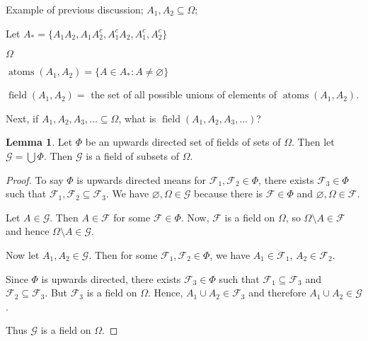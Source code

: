 \documentclass{article}
\DeclareMathOperator{\atoms}{atoms}
\DeclareMathOperator{\field}{field}
\theoremstyle{definition}
\newtheorem{lemma}[theorem]{Lemma}
\begin{document}
Example of previous discussion; $A_1, A_2 \subseteq \Omega$;

Let $A_* = \{A_1 A_2, A_1 A_2^c,A_1^c A_2,A_1^c,A_2^c\}$

\begin{center}
\Huge{${\Omega}$} \\ \vspace{0.5cm}
\end{center}

$\atoms(A_1, A_2) = \{A \in A_* : A \neq \varnothing\}$

$\field(A_1, A_2) = $ the set of all possible unions of elements of $\atoms (A_1, A_2)$.

Next, if $A_1,A_2,A_3,\dots \subseteq \Omega$, what is $\field (A_1,A_2,A_3,\dots)$?

\begin{lemma}
Let $\Phi$ be an upwards directed set of fields of sets of $\Omega$. Then let $\mathscr{G} = \bigcup \Phi$. Then $\mathscr{G}$ is a field of subsets of $\Omega$.
\end{lemma}
\begin{proof}
    To say $\Phi$ is upwards directed means for $\mathscr{F}_1, \mathscr{F}_2 \in \Phi$, there exists $\mathscr{F}_3 \in \Phi$ such that $\mathscr{F}_1, \mathscr{F}_2 \subseteq \mathscr{F}_3$.
    We have $\varnothing, \Omega \in \mathscr{G}$ because there is $\mathscr{F} 
    \in \Phi$ and $\varnothing, \Omega \in \mathscr{F}$.
    
    Let $A \in \mathscr{G}$. Then $A \in \mathscr{F}$ for some $\mathscr{F} \in \Phi$. Now, $\mathscr{F}$ is a field on $\Omega$, so $\Omega \setminus A \in \mathscr{F}$ and hence $\Omega \setminus A \in \mathscr{G}$.
    
    Now let $A_1, A_2 \in \mathscr{G}$. Then for some $\mathscr{F}_1, \mathscr{F}_2 \in \Phi$, we have $A_1 \in \mathscr{F}_1$, $A_2 \in \mathscr{F}_2$.
    
    Since $\Phi$ is upwards directed, there exists $\mathscr{F}_3 \in \Phi$ such that $\mathscr{F_1} \subseteq \mathscr{F}_3$ and $\mathscr{F}_2 \subseteq \mathscr{F}_3$. But $\mathscr{F}_3$ is a field on $\Omega$. Hence, $A_1 \cup A_2 \in \mathscr{F}_3$ and therefore $A_1 \cup A_2 \in \mathscr{G}$.
    
    Thus $\mathscr{G}$ is a field on $\Omega$.
\end{proof}
\end{document}
